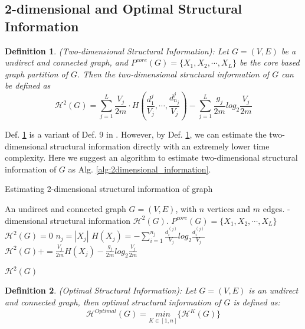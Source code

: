 \documentclass[10pt, conference, letterpaper]{IEEEtran}
\newtheorem{definition}{Definition}
\begin{document}
\subsection{2-dimensional and Optimal Structural Information}
\begin{definition}\label{def:2dimensional_information}
	(Two-dimensional Structural Information): Let $G=(V,E)$ be a undirect and connected graph, and $P^{core}(G)=\{X_1,X_2,\cdots,X_L\}$ be the core based graph partition of $G$. Then the two-dimensional structural information of $G$ can be defined as
	\begin{equation}
	\mathcal{H}^{2}(G)=\sum_{j=1}^{L}\frac{V_j}{2m}\cdot H(\frac{d_{1}^{j}}{V_j},\cdots,\frac{d_{n_j}^{j}}{V_j})-\sum_{j=1}^{L}\frac{g_j}{2m}log_2 \frac{V_j}{2m}
	\end{equation} 
\end{definition}

Def. \ref{def:2dimensional_information} is a variant of Def. 9 in \cite{li2016}. However, by Def. \ref{def:2dimensional_information}, we can estimate the two-dimensional structural information directly with an extremely lower time complexity. Here we suggest an algorithm to estimate two-dimensional structural information of $G$ as Alg. \ref{alg:2dimensional_information}.

\begin{algorithm}  
	\caption{Estimating 2-dimensional structural information of graph}\label{alg:2dimensional_information}  
	\begin{algorithmic}[1] %
		\Require An undirect and connected graph $G=(V,E)$, with $n$ vertices and $m$ edges.
		-dimensional structural information $\mathcal{H}^{2}(G)$.
		\State $P^{core}(G)= \{X_1,X_2,\cdots,X_L\}$
		\State $\mathcal{H}^{2}(G)=0$
		\State $n_j=|X_j|$
		\State $H(X_j)=-\sum_{i=1}^{n_j}\frac{d_i^{(j)}}{V_j}log_2 \frac{d_i^{(j)}}{V_j}$
		\State $\mathcal{H}^{2}(G)+=\frac{V_j}{2m}H(X_j)-\frac{g_j}{2m}log_2\frac{V_j}{2m}$
		\EndFor
	\end{algorithmic} 
	\Return $\mathcal{H}^{2}(G)$
\end{algorithm} 

\begin{definition}
 (Optimal Structural Information): Let $G=(V,E)$ is an undirect and connected graph, then optimal structural information of $G$ is defined as:
 \begin{equation}
 \label{eq:optimal_information}
 \mathcal{H}^{Optimal}(G)=\underset{K\in [1,n]}{min}\{\mathcal{H}^{K}(G)\}
 \end{equation} 
 \end{definition}
\end{document}
